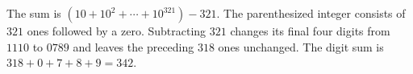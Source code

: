The sum is $(10+10^2+\cdots+10^{321})-321$. The parenthesized integer consists of $321$ ones followed by a zero. Subtracting $321$ changes its final four digits from $1110$ to $0789$ and leaves the preceding $318$ ones unchanged. The digit sum is $318+0+7+8+9=\boxed{342}$.
